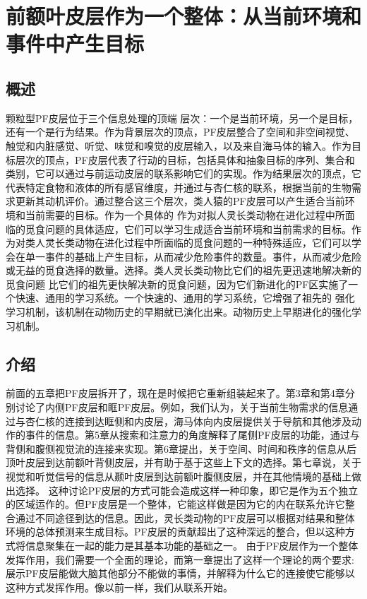 \chapter{前额叶皮层作为一个整体：从当前环境和事件中产生目标}

\section{概述}
颗粒型PF皮层位于三个信息处理的顶端 层次：一个是当前环境，另一个是目标，还有一个是行为结果。作为背景层次的顶点，PF皮层整合了空间和非空间视觉、触觉和内脏感觉、听觉、味觉和嗅觉的皮层输入，以及来自海马体的输入。作为目标层次的顶点，PF皮层代表了行动的目标，包括具体和抽象目标的序列、集合和类别，它可以通过与前运动皮层的联系影响它们的实现。作为结果层次的顶点，它代表特定食物和液体的所有感官维度，并通过与杏仁核的联系，根据当前的生物需求更新其动机评价。通过整合这三个层次，类人猿的PF皮层可以产生适合当前环境和当前需要的目标。作为一个具体的 作为对拟人灵长类动物在进化过程中所面临的觅食问题的具体适应，它们可以学习生成适合当前环境和当前需求的目标。作为对类人灵长类动物在进化过程中所面临的觅食问题的一种特殊适应，它们可以学会在单一事件的基础上产生目标，从而减少危险事件的数量。事件，从而减少危险或无益的觅食选择的数量。选择。类人灵长类动物比它们的祖先更迅速地解决新的觅食问题 比它们的祖先更快解决新的觅食问题，因为它们新进化的PF区实施了一个快速、通用的学习系统。一个快速的、通用的学习系统，它增强了祖先的 强化学习机制，该机制在动物历史的早期就已演化出来。动物历史上早期进化的强化学习机制。

\section{介绍}
前面的五章把PF皮层拆开了，现在是时候把它重新组装起来了。第3章和第4章分别讨论了内侧PF皮层和眶PF皮层。例如，我们认为，关于当前生物需求的信息通过与杏仁核的连接到达眶侧和内皮层，海马体向内皮层提供关于导航和其他涉及动作的事件的信息。第5章从搜索和注意力的角度解释了尾侧PF皮层的功能，通过与背侧和腹侧视觉流的连接来实现。第6章提出，关于空间、时间和秩序的信息从后顶叶皮层到达前额叶背侧皮层，并有助于基于这些上下文的选择。第七章说，关于视觉和听觉信号的信息从颞叶皮层到达前额叶腹侧皮层，并在其他情境的基础上做出选择。
这种讨论PF皮层的方式可能会造成这样一种印象，即它是作为五个独立的区域运作的。但PF皮层是一个整体，它能这样做是因为它的内在联系允许它整合通过不同途径到达的信息。因此，灵长类动物的PF皮层可以根据对结果和整体环境的总体预测来生成目标。PF皮层的贡献超出了这种深远的整合，但以这种方式将信息聚集在一起的能力是其基本功能的基础之一。
由于PF皮层作为一个整体发挥作用，我们需要一个全面的理论，而第一章提出了这样一个理论的两个要求:展示PF皮层能做大脑其他部分不能做的事情，并解释为什么它的连接使它能够以这种方式发挥作用。像以前一样，我们从联系开始。

